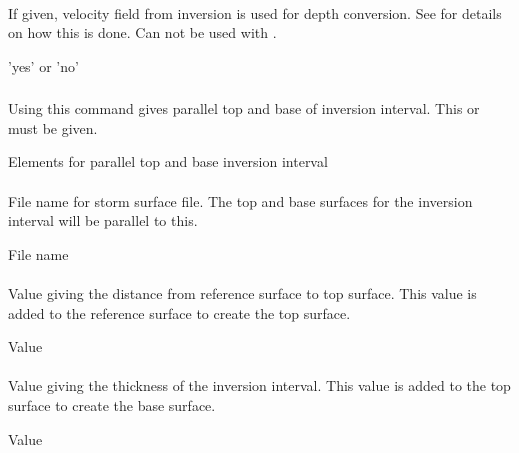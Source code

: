 \paragraph{} 
 \slist
   \item \Description If given, velocity field from inversion is used for depth conversion. See  for details on how this is done. Can not be used with .
   \item \Argument 'yes' or 'no'
   \item \Default
 \elist

\subsubsection{} 
 \slist
   \item \Description Using this command gives parallel top and base of inversion interval. This or  must be given.
   \item \Argument Elements for parallel top and base inversion interval
   \item \Default
 \elist

\paragraph{} 
 \slist
   \item \Description File name for storm surface file. The top and base surfaces for the inversion interval will be parallel to this.
   \item \Argument File name
   \item \Default
 \elist

\paragraph{} 
 \slist
   \item \Description Value giving the distance from reference surface to top surface. This value is added to the reference surface to create the top surface.
   \item \Argument Value
   \item \Default
 \elist

\paragraph{}
 \slist
   \item \Description Value giving the thickness of the inversion interval. This value is added to the top surface to create the base surface.
   \item \Argument Value
   \item \Default
 \elist

